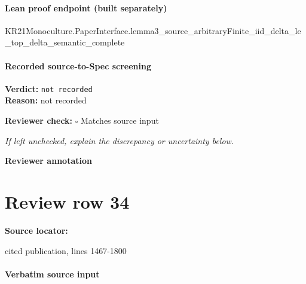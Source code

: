\documentclass[10pt]{article}
\newcommand{\reviewerbox}{%
  \par\noindent\fbox{\parbox{0.96\linewidth}{\rule{0pt}{0.38in}}}\par
}
\newcommand{\reviewmatch}[1]{%
  \par\noindent\textbf{Reviewer check:} $\square$\; #1\par
  \noindent\emph{If left unchecked, explain the discrepancy or uncertainty below.}\par
}
\begin{document}
\paragraph{Lean proof endpoint (built separately)}\begin{ReviewVerbatim}
KR21Monoculture.PaperInterface.lemma3_source_arbitraryFinite_iid_delta_le_top_delta_semantic_complete
\end{ReviewVerbatim}

\paragraph{Recorded source-to-Spec screening}
\textbf{Verdict:} \texttt{not recorded}
\\
\textbf{Reason:} not recorded
\reviewmatch{Matches source input}
\noindent\textbf{Reviewer annotation}\par
\reviewerbox
\clearpage
\hypertarget{source-claim-aceb5e75cb75d8b8}{}
\section*{Review row 34}
\textbf{Source locator:} {\footnotesize\raggedright cited publication, lines 1467-\allowbreak{}1800\par}
\paragraph{Verbatim source input}
\begin{ReviewVerbatim}
\end{ReviewVerbatim}
\end{document}
